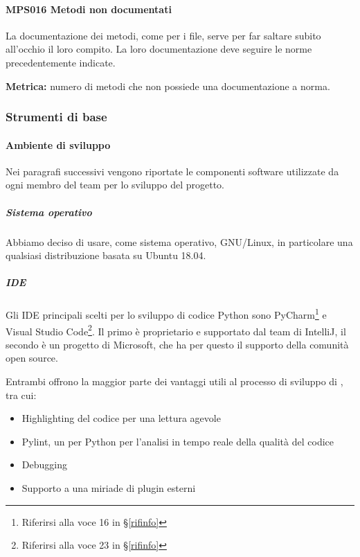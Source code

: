         \paragraph{MPS016 Metodi non documentati}
        La documentazione dei metodi, come per i file, serve per far saltare subito all'occhio il loro compito. La loro documentazione deve seguire le norme precedentemente indicate.

        \textbf{Metrica:} numero di metodi che non possiede una documentazione a norma.

        \subsubsection{Strumenti di base}\label{PP:Sviluppo:Strumenti}

	    \paragraph{Ambiente di sviluppo}\label{PP:Sviluppo:Strumenti:AmbienteSviluppo}
	    Nei paragrafi successivi vengono riportate le componenti software utilizzate da ogni membro del team per lo sviluppo del progetto.


	    \subparagraph{Sistema operativo}\label{PP:Sviluppo:Strumenti:AmbienteSviluppo:SistemaOperativo}
	    Abbiamo deciso di usare, come sistema operativo, GNU/Linux, in particolare una qualsiasi distribuzione basata su Ubuntu 18.04.

	    \subparagraph{IDE}\label{PP:Sviluppo:Strumenti:AmbienteSviluppo:IDE} %
		Gli IDE principali scelti per lo sviluppo di codice Python sono
		{PyCharm}\footnote{Riferirsi alla voce
		16
		 in \S\ref{rifinfo}} e
		{Visual Studio Code}\footnote{Riferirsi alla voce
		23
		  in \S\ref{rifinfo}}.
		Il primo è proprietario e supportato dal team di IntelliJ, il secondo è un progetto  di Microsoft, che ha
		per questo il supporto della comunità open source.\par
		Entrambi offrono la maggior parte dei vantaggi utili al processo di sviluppo di \progetto, tra cui:
		\begin{itemize}
			\item Highlighting del codice per una lettura agevole
			\item Pylint, un  per Python per l'analisi in tempo reale della qualità del codice
			\item Debugging
			\item Supporto a una miriade di plugin esterni
		\end{itemize}

